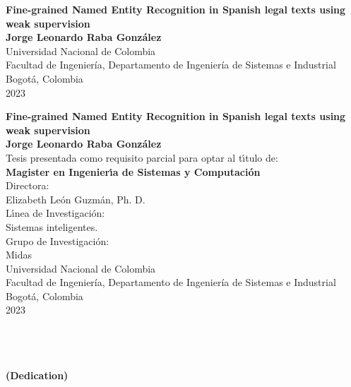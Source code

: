 \begin{center}
\begin{figure}
\centering%
%
\end{figure}
\thispagestyle{empty} \vspace*{2.0cm} \textbf{\huge
Fine-grained Named Entity Recognition in Spanish legal texts
using weak supervision}\\[5.5cm]
\Large\textbf{Jorge Leonardo Raba Gonz\'{a}lez}\\[5.5cm]
\small Universidad Nacional de Colombia\\
Facultad de Ingenier\'{i}a, Departamento de Ingenier\'{i}a de Sistemas e Industrial\\
Bogot\'{a}, Colombia\\
2023\\
\end{center}

\newpage{\pagestyle{empty}\cleardoublepage}

\newpage
\begin{center}
\thispagestyle{empty} \vspace*{0cm} \textbf{\huge
Fine-grained Named Entity Recognition in Spanish legal texts
using weak supervision}\\[3.0cm]
\Large\textbf{Jorge Leonardo Raba Gonz\'{a}lez}\\[2.5cm]
\small Tesis presentada como requisito parcial para optar al
t\'{\i}tulo de:\\
\textbf{Magister en Ingenier\'{\i}a de Sistemas y Computaci\'{o}n}\\[2.5cm]
Directora:\\
Elizabeth Le\'{o}n Guzm\'{a}n, Ph. D.\\[2.0cm]
L\'{\i}nea de Investigaci\'{o}n:\\
Sistemas inteligentes.\\
Grupo de Investigaci\'{o}n:\\
Midas\\[2.5cm]
Universidad Nacional de Colombia\\
Facultad de Ingenier\'{i}a, Departamento de Ingenier\'{i}a de Sistemas e Industrial\\
Bogot\'{a}, Colombia\\
2023\\
\end{center}

\newpage{\pagestyle{empty}\cleardoublepage}

\newpage
\thispagestyle{empty} \textbf{}\normalsize
\\\\\\%
\textbf{(Dedication)}\\[4.0cm]

